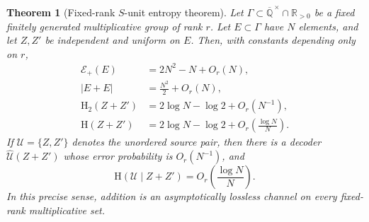 \documentclass[11pt,oneside]{article}
\newtheorem{theorem}{Theorem}[section]
\theoremstyle{definition}
\theoremstyle{remark}
\newcommand{\R}{\mathbb{R}}
\newcommand{\Q}{\mathbb{Q}}
\newcommand{\HH}{\mathrm{H}}
\newcommand{\abs}[1]{\left|#1\right|}
\begin{document}
\begin{theorem}[Fixed-rank $S$-unit entropy theorem]\label{thm:sunit-entropy}
Let \(\Gamma\subset\overline{\Q}^{\,\times}\cap\R_{>0}\) be a fixed finitely generated multiplicative group of rank \(r\).  Let \(E\subset\Gamma\) have \(N\) elements, and let \(Z,Z'\) be independent and uniform on \(E\).  Then, with constants depending only on \(r\),
\begin{align}
 \mathcal E_+(E)&=2N^2-N+O_r(N),\label{eq:sunit-energy}\\
 \abs{E+E}&=\frac{N^2}{2}+O_r(N),\label{eq:sunit-sumset}\\
 \HH_2(Z+Z')&=2\log N-\log2+O_r(N^{-1}),\label{eq:sunit-collision}\\
 \HH(Z+Z')&=2\log N-\log2+O_r\!\left(\frac{\log N}{N}\right).\label{eq:sunit-shannon}
\end{align}
If \(\mathcal U=\{Z,Z'\}\) denotes the unordered source pair, then there is a decoder \(\widehat{\mathcal U}(Z+Z')\) whose error probability is \(O_r(N^{-1})\), and
\begin{equation}\label{eq:sunit-fano}
 \HH(\mathcal U\mid Z+Z')=O_r\!\left(\frac{\log N}{N}\right).
\end{equation}
In this precise sense, addition is an asymptotically lossless channel on every fixed-rank multiplicative set.
\end{theorem}
\end{document}
